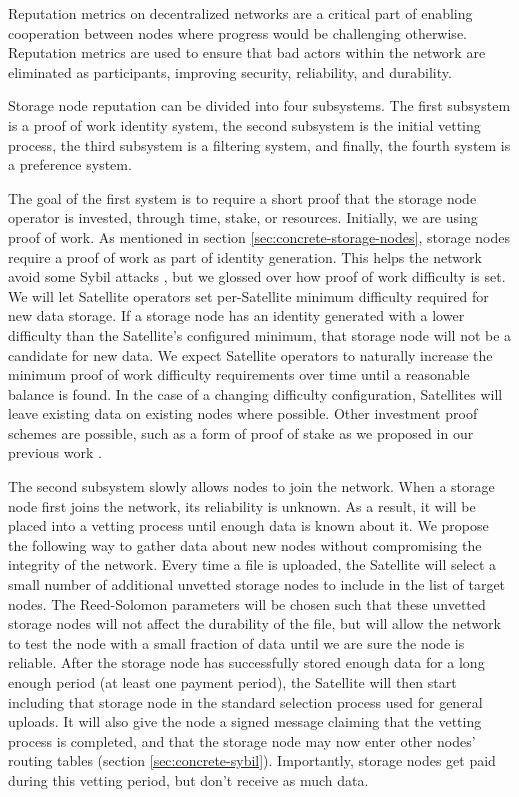 \documentclass[8pt,fleqn,openany]{book}
\begin{document}
Reputation metrics on decentralized networks are a critical part of
enabling cooperation
between nodes
where progress would be challenging otherwise. Reputation metrics
are used to ensure that bad actors
within the network are eliminated as participants, improving security,
reliability, and durability.

Storage node reputation can be divided into four subsystems.
The first subsystem is a proof of work identity system,
the second subsystem is the initial vetting process,
the third subsystem is a filtering system, and finally,
the fourth system is a preference system.

The goal of the first system is to require a short proof that the storage node
operator is invested, through time, stake, or resources. Initially, we are using
proof of work.
As mentioned in section \ref{sec:concrete-storage-nodes}, storage nodes require
a proof of work as part of identity generation. This helps the network avoid
some Sybil attacks \cite{sybil-attack}, but we glossed over how proof of work
difficulty is set. We will let Satellite operators set per-Satellite minimum
difficulty required for new data storage. If a storage node has an identity generated
with a lower difficulty than the Satellite's configured minimum, that storage
node will not be a candidate for new data.
We expect Satellite operators to naturally increase the minimum proof of work
difficulty requirements over time until a reasonable balance is found.
In the case of a changing difficulty configuration, Satellites will leave
existing data on existing nodes where possible.
Other investment proof schemes are possible, such as a form of proof of stake as
we proposed in our previous work \cite{sybil-cost}.

The second subsystem slowly allows nodes to join the network.
When a storage node first joins the network, its reliability is unknown.
As a result, it will be placed into a vetting
process until enough data is known about it.
We propose the following way to gather data about new nodes
without compromising the integrity of the network.
Every time a file is uploaded, the Satellite will select a small number of
additional unvetted storage nodes to include in the list of target nodes.
The Reed-Solomon parameters will be chosen such that these unvetted storage
nodes will not affect the durability of the file, but will allow the network
to test the node
with a small fraction of data until we are sure the node is reliable.
After the storage node has successfully stored enough data for a long enough
period (at least one payment period),
the Satellite will then start including that storage
node in the standard selection process used for general uploads.
It will also give the node a signed message claiming that the vetting process
is completed, and that the storage node may now enter other nodes' routing tables
(section \ref{sec:concrete-sybil}).
Importantly, storage nodes get paid during this
vetting period, but don't receive as much data.
\end{document}
